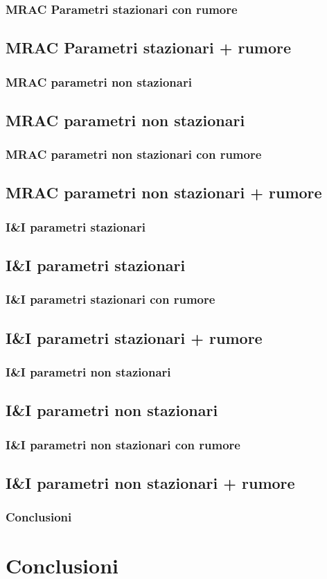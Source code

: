 \documentclass{beamer}
\begin{document}
\begin{frame}
	\frametitle{MRAC Parametri stazionari con rumore}
	\subsection{MRAC Parametri stazionari + rumore}

\end{frame}
\begin{frame}
	\frametitle{MRAC parametri non stazionari}
	\subsection{MRAC parametri non stazionari}

\end{frame}
\begin{frame}
	\frametitle{MRAC parametri non stazionari con rumore}
	\subsection{MRAC parametri non stazionari + rumore}

\end{frame}
\begin{frame}
	\frametitle{I\&I parametri stazionari}
	\subsection{I\&I parametri stazionari}

\end{frame}
\begin{frame}
	\frametitle{I\&I parametri stazionari con rumore}
	\subsection{I\&I parametri stazionari + rumore}

\end{frame}
\begin{frame}
	\frametitle{I\&I parametri non stazionari}
	\subsection{I\&I parametri non stazionari}

\end{frame}
\begin{frame}
	\frametitle{I\&I parametri non stazionari con rumore}
	\subsection{I\&I parametri non stazionari + rumore}

\end{frame}
\begin{frame}
	\frametitle{Conclusioni}
	\section{Conclusioni}

\end{frame}
\end{document}
